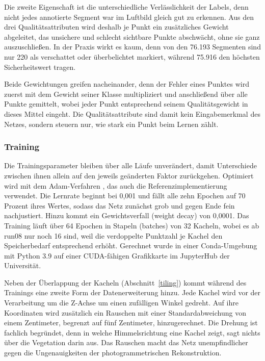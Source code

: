 Die zweite Eigenschaft ist die unterschiedliche Verlässlichkeit der Labels, denn nicht jedes annotierte Segment war im Luftbild gleich gut zu erkennen. Aus den drei Qualitätsattributen wird deshalb je Punkt ein zusätzliches Gewicht abgeleitet, das unsichere und schlecht sichtbare Punkte abschwächt, ohne sie ganz auszuschließen. In der Praxis wirkt es kaum, denn von den 76.193 Segmenten sind nur 220 als verschattet oder überbelichtet markiert, während 75.916 den höchsten Sicherheitswert tragen.

Beide Gewichtungen greifen nacheinander, denn der Fehler eines Punktes wird zuerst mit dem Gewicht seiner Klasse multipliziert und anschließend über alle Punkte gemittelt, wobei jeder Punkt entsprechend seinem Qualitätsgewicht in dieses Mittel eingeht. Die Qualitätsattribute sind damit kein Eingabemerkmal des Netzes, sondern steuern nur, wie stark ein Punkt beim Lernen zählt.

\subsubsection{Training}\label{training}

Die Trainingsparameter bleiben über alle Läufe unverändert, damit Unterschiede zwischen ihnen allein auf den jeweils geänderten Faktor zurückgehen. Optimiert wird mit dem Adam-Verfahren \cite{Kingma.2015}, das auch die Referenzimplementierung verwendet. Die Lernrate beginnt bei 0,001 und fällt alle zehn Epochen auf 70 Prozent ihres Wertes, sodass das Netz zunächst grob und gegen Ende fein nachjustiert. Hinzu kommt ein Gewichtsverfall (weight decay) von 0,0001. Das Training läuft über 64 Epochen in Stapeln (batches) von 32 Kacheln, wobei es ab run08 nur noch 16 sind, weil die verdoppelte Punktzahl je Kachel den Speicherbedarf entsprechend erhöht. Gerechnet wurde in einer Conda-Umgebung mit Python 3.9 auf einer CUDA-fähigen Grafikkarte im JupyterHub der Universität.

Neben der Überlappung der Kacheln (Abschnitt~\ref{tiling}) kommt während des Trainings eine zweite Form der Datenerweiterung hinzu. Jede Kachel wird vor der Verarbeitung um die Z-Achse um einen zufälligen Winkel gedreht. Auf ihre Koordinaten wird zusätzlich ein Rauschen mit einer Standardabweichung von einem Zentimeter, begrenzt auf fünf Zentimeter, hinzugerechnet. Die Drehung ist fachlich begründet, denn in welche Himmelsrichtung eine Kachel zeigt, sagt nichts über die Vegetation darin aus. Das Rauschen macht das Netz unempfindlicher gegen die Ungenauigkeiten der photogrammetrischen Rekonstruktion.

